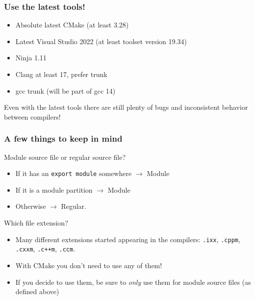 \documentclass[aspectratio=169]{beamer}
\newif\iftransitions
\newcommand{\cpause}{\iftransitions \pause \fi}
\begin{document}
\begin{frame}
  \frametitle{Use the latest tools!}

  \begin{itemize}
  \item Absolute latest CMake (at least 3.28)
  \item Latest Visual Studio 2022 (at least toolset version 19.34)
  \item Ninja 1.11
  \item Clang at least 17, prefer trunk
  \item gcc trunk (will be part of gcc 14)
  \end{itemize}

  Even with the latest tools there are still plenty of bugs and inconsistent behavior between compilers!
\end{frame}


\begin{frame}[fragile]

  \frametitle{A few things to keep in mind}

  Module source file or regular source file?
  \begin{itemize}
  \item If it has an \texttt{export module} somewhere $\rightarrow$ Module
  \item If it is a module partition $\rightarrow$ Module
  \item Otherwise $\rightarrow$ Regular.
  \end{itemize}

  \cpause
  Which file extension?
  \begin{itemize}
  \item Many different extensions started appearing in the compilers: \texttt{.ixx}, \texttt{.cppm}, \texttt{.cxxm}, \texttt{.c++m}, \texttt{.ccm}.
  \item With CMake you don't need to use any of them!
  \item If you decide to use them, be sure to \textit{only} use them for module source files (as defined above)
  \end{itemize}

\end{frame}

%
\end{document}
